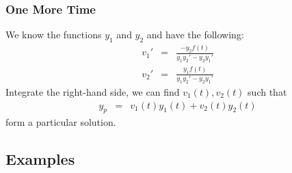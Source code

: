 \begin{frame}
  \frametitle{One More Time}

  We know the functions $y_1$ and $y_2$ and have the following:
  \begin{eqnarray*}
    v_1' & = & \frac{ -y_2 f(t)}{y_1 y_2'-y_2 y_1'} \\
    v_2' & = & \frac{y_1 f(t)}{y_1 y_2'-y_2 y_1'}
  \end{eqnarray*}
  Integrate the right-hand side, we can find $v_1(t), v_2(t)$ such that
  \begin{eqnarray*}
      y_p & = & v_1(t) y_1(t) + v_2(t) y_2(t)
    \end{eqnarray*}
  form a particular solution.   
\end{frame}

\subsection{Examples}


